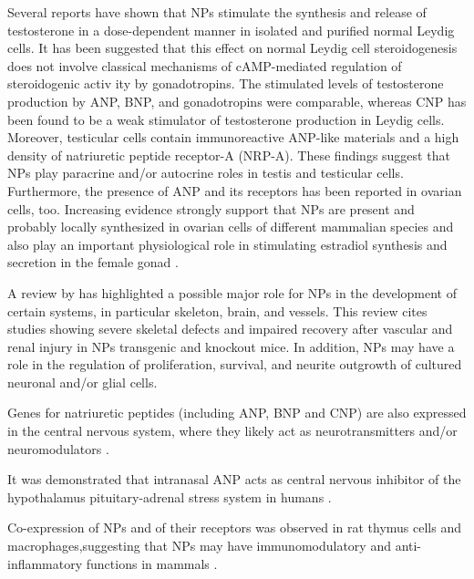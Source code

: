 \documentclass[14pt,a4paper,onecolumn]{extarticle}
\begin{document}
Several reports have shown that NPs stimulate the synthesis and release of testosterone in a dose-dependent manner in isolated and purified normal Leydig cells. It has been suggested that this effect on normal Leydig cell steroidogenesis does not involve classical mechanisms of cAMP-mediated regulation of steroidogenic activ ity by gonadotropins. The stimulated levels of testosterone production by ANP, BNP, and gonadotropins were comparable, whereas CNP has been found to be a weak stimulator of testosterone production in Leydig cells. Moreover, testicular cells contain immunoreactive ANP-like materials and a high density of natriuretic peptide receptor-A (NRP-A). These findings suggest that NPs play paracrine and/or autocrine roles in testis and testicular cells. Furthermore, the presence of ANP and its receptors has been reported in ovarian cells, too. Increasing evidence strongly support that NPs are present and probably locally synthesized in ovarian cells of different mammalian species and also play an important physiological role in stimulating estradiol synthesis and secretion in the female gonad \citep{112}. %

A review by \citep{107} has highlighted a possible major role for NPs in the development of certain systems, in particular skeleton, brain, and vessels. This review cites  studies showing severe skeletal defects and impaired recovery after vascular and renal injury in NPs transgenic and knockout mice. In addition, NPs may have a role in the regulation of proliferation, survival, and neurite outgrowth of cultured neuronal and/or glial cells.


Genes for natriuretic peptides (including ANP, BNP and CNP) are also expressed in the central nervous system, where they likely act as neurotransmitters and/or neuromodulators \citep{100}.

It was demonstrated that intranasal ANP acts as central nervous inhibitor of the hypothalamus pituitary-adrenal stress system in humans \citep{103}.

Co-expression of NPs and of their receptors was observed in rat thymus cells and macrophages,suggesting that NPs may have immunomodulatory and anti-inflammatory functions in mammals \citep{106}.
\end{document}
